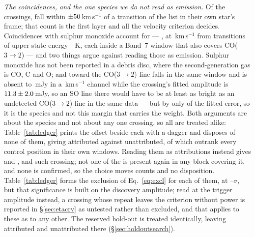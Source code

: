\begin{table}
\centering
\footnotesize
\caption{The line mask, by species: the number of transitions $N$ it holds,
the frequency range they span inside the searched intervals and their
upper-state energies. Hydrogen recombination lines carry no tabulated
$E_{\rm u}$. The criterion and the dated query above define the list
exactly, so the individual transitions can be recovered from the line
catalogues themselves.}
\label{tab:masklines}

\end{table}

\emph{The coincidences, and the one species we do not read as emission.} Of
the \NCross{} crossings, \MkNCoinc{} fall within
$\pm50$\,km\,s$^{-1}$ of a transition of the list in their own
star's frame; that count is the first layer and all the velocity criterion
decides. Coincidences with sulphur monoxide account for \MkNSODecide{} ---
\MkSOStars, at \MkSODvList\,km\,s$^{-1}$ from transitions of upper-state
energy \MkSOEuLo--\MkSOEuHi\,K, each inside a Band~7 window that also covers
CO($3\to2$) --- and two things argue against reading those as emission.
Sulphur monoxide has not been reported in a debris disc, where the
second-generation gas is CO, C and O; and toward \FrCpStar{} the CO($3\to2$)
line falls in the same window and is absent to \FrCpCoLimMJy\,mJy in a
\FrCpCoChanKms\,km\,s$^{-1}$ channel while the crossing's fitted amplitude is
$11.3\pm2.0$\,mJy, so an SO line there would have to be at
least as bright as an undetected CO($3\to2$) line in the same data --- but
by only \RqAmpSigmaCp{} of the fitted error, so it is the species and not
this margin that carries the weight. Both arguments are about the species and
not about any one crossing, so all \MkNSODecide{} are treated alike:
Table~\ref{tab:ledger} prints the offset beside each with a dagger and
disposes of none of them, giving \MkAttr{} attributed against \MkUnattr{}
unattributed, of which \MkRankLeadWord{} outrank every control position in
their own windows.
Reading them as attributions instead gives \MkAttrAlt{} and \MkUnattrAlt,
and \MkRankLeadAlt{} such crossing; not one of the \MkNSODecide{} is present
again in any block covering it, and none is confirmed, so the choice moves
counts and no disposition. Table~\ref{tab:ledger} forms the exclusion of
Eq.~\ref{eq:excl} for each of them, at
\MkAttrExclLo--\MkAttrExclHi$\sigma$, but that significance is built on the
discovery amplitude; read at the trigger amplitude instead, a crossing whose
repeat leaves the criterion without power is reported in
\S\ref{sec:etacrv} as untested rather than excluded, and that applies to
these as to any other. The reserved hold-out is treated identically, leaving \HoNAttr{}
attributed and \HoNUnattr{} unattributed there (\S\ref{sec:holdoutsearch}).


